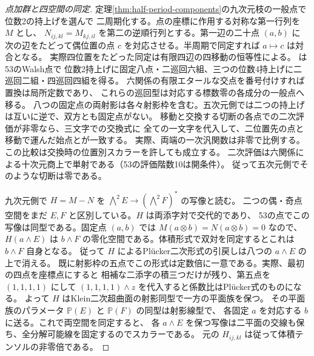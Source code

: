 \begin{proof}[点加群と四空間の同定]
定理\ref{thm:half-period-components}の九次元枝の一般点で位数2の持上げを選んで
二周期化する。点の座標に作用する対称な第一行列を $M$ とし、
$N_{ij,kl}=M_{kj,il}$ を第二の逆順行列とする。第一辺の二十点 $(a,b)$ に
次の辺をたどって偶位置の点 $c$ を対応させる。半周期で同定すれば $a\mapsto c$ は対合となる。
実際四位置をたどった同定は有限四辺の四移動の恒等性による。
 は53のWalsh点で
位数2持上げに固定八点・二巡回六組、三つの位数4持上げに二巡回二組・四巡回四組を得る。
六関係の有限エタールな交点を番号付けすれば置換は局所定数であり、
これらの巡回型は対応する標数零の各成分の一般点へ移る。
八つの固定点の両射影は各々射影枠を含む。五次元側では二つの持上げは互いに逆で、双方とも固定点がない。
移動と交換する切断の各点での二次評価が非零なら、三文字での交換式に
全ての一文字を代入して、二位置先の点と移動で運んだ始点とが一致する。
実際、両端の一次汎関数は非零で比例する。この比較は交換時の位置別スカラーを許しても成立する。
二次評価は六関係による十次元商上で単射である（53の評価階数10は開条件）。
従って五次元側でそのような切断は零である。

九次元側で $H=M-N$ を $\bigwedge^2 E\to(\bigwedge^2 F)^*$ の写像と読む。
二つの偶・奇点空間をまだ $E,F$ と区別している。$H$ は両添字対で交代的であり、
53の点でこの写像は同型である。固定点 $(a,b)$ では
$M(a\otimes b)=N(a\otimes b)=0$ なので、$H(a\wedge E)$ は
$b\wedge F$ の零化空間である。体積形式で双対を同定するとこれは $b\wedge F$ 自身となる。
従って $H$ によるPlücker二次形式の引戻しは八つの $a\wedge E$ の上で消える。
既に射影枠の五点でこの形式は定数倍に一意である。実際、最初の四点を座標点にすると
相補な二添字の積三つだけが残り、第五点を $(1,1,1,1)$ にして
$(1,1,1,1)\wedge z$ を代入すると係数比はPlücker式のものになる。
よって $H$ はKlein二次超曲面の射影同型で一方の平面族を保つ。
その平面族のパラメータ $\mathbb P(E)$ と $\mathbb P(F)$ の同型は射影線型で、
各固定 $a$ を対応する $b$ に送る。これで両空間を同定すると、
各 $a\wedge E$ を保つ写像は二平面の交線も保ち、全分解可能線を固定するのでスカラーである。
元の $H_{ij,kl}$ は従って体積テンソルの非零倍である。

\end{proof}

